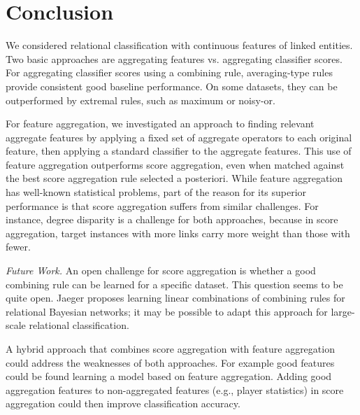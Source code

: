 \documentclass[conference]{IEEEtran}
\begin{document}



\section{Conclusion}


We considered relational classification with continuous features of linked entities. Two basic approaches are aggregating features vs. aggregating classifier scores. For aggregating classifier scores using a combining rule, averaging-type rules provide consistent good baseline performance. On some datasets, they can be outperformed by extremal rules, such as maximum or noisy-or.

For feature aggregation, we investigated an approach to finding relevant aggregate features by applying a fixed set of aggregate operators to each original feature, then applying a standard classifier to the aggregate features. This use of feature aggregation outperforms score aggregation, even when matched against the best score aggregation rule selected a posteriori. While feature aggregation has well-known statistical problems, part of the reason for its superior performance is that score aggregation suffers from similar challenges. For instance, degree disparity is a challenge for both approaches, because in score aggregation, target instances with more links carry more weight than those with fewer.

{\em Future Work.} An open challenge for score aggregation is whether a good combining rule can be learned for a specific dataset. This question seems to be quite open.
Jaeger \cite{Jaeger2007} proposes learning linear combinations of combining rules for relational Bayesian networks; it may be possible to adapt this approach for large-scale
relational classification.

A hybrid approach that combines score aggregation with feature aggregation could address the weaknesses of both approaches.
For example good features could be found learning a model based on feature aggregation. Adding  good aggregation features to non-aggregated features (e.g., player statistics) in score aggregation could then improve classification accuracy.
\end{document}
